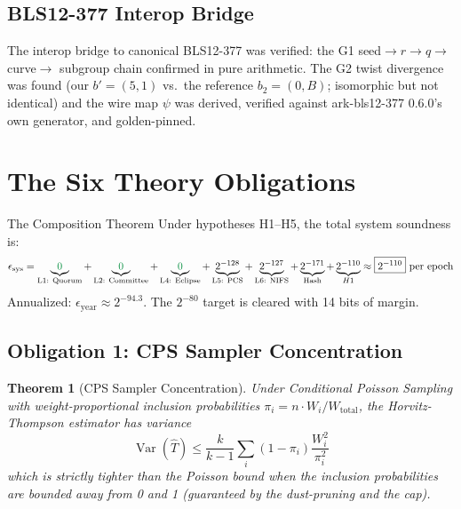 \documentclass[11pt, a4paper]{article}
\theoremstyle{plain}
\newtheorem{theorem}{Theorem}
\theoremstyle{definition}
\theoremstyle{remark}
\begin{document}
\subsection{BLS12-377 Interop Bridge}

The interop bridge to canonical BLS12-377 was verified: the G1
seed$\to r \to q \to$ curve$\to$ subgroup chain confirmed in pure
arithmetic. The G2 twist divergence was found (our $b' = (5,1)$ vs.\
the reference $b_2 = (0, B)$; isomorphic but not identical) and the
wire map $\psi$ was derived, verified against ark-bls12-377 0.6.0's
own generator, and golden-pinned.

\section{The Six Theory Obligations}
\label{sec:a6}

\begin{keybox}{The Composition Theorem}
Under hypotheses H1--H5, the total system soundness is:
\begin{equation}
\epsilon_{\text{sys}} =
\underbrace{\textcolor{hsmaGreen}{0}}_{\text{L1: Quorum}} +
\underbrace{\textcolor{hsmaGreen}{0}}_{\text{L2: Committee}} +
\underbrace{\textcolor{hsmaGreen}{0}}_{\text{L4: Eclipse}} +
\underbrace{2^{-128}}_{\text{L5: PCS}} +
\underbrace{2^{-127}}_{\text{L6: NIFS}} +
\underbrace{2^{-171}}_{\text{Hash}} +
\underbrace{2^{-110}}_{H1}
\approx \boxed{2^{-110}} \text{ per epoch}
\end{equation}
Annualized: $\epsilon_{\text{year}} \approx 2^{-94.3}$.
The $2^{-80}$ target is cleared with 14 bits of margin.
\end{keybox}

\subsection{Obligation 1: CPS Sampler Concentration}

\begin{theorem}[CPS Sampler Concentration]
\label{thm:cps}
Under Conditional Poisson Sampling with weight-proportional inclusion
probabilities $\pi_i = n \cdot W_i / W_{\text{total}}$, the
Horvitz-Thompson estimator has variance
\[
\operatorname{Var}(\hat{T}) \le \frac{k}{k-1} \sum_i
(1 - \pi_i) \frac{W_i^2}{\pi_i^2}
\]
which is strictly tighter than the Poisson bound when the inclusion
probabilities are bounded away from 0 and 1 (guaranteed by the
dust-pruning and the cap).
\end{theorem}
\end{document}
